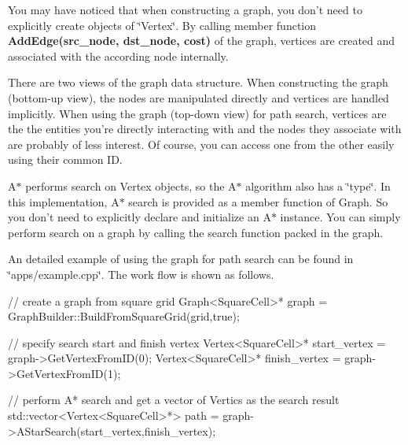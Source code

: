 \begin{DoxyItemize}
\item You may have noticed that when constructing a graph, you don't need to explicitly create objects of \char`\"{}\-Vertex\char`\"{}. By calling member function {\bfseries Add\-Edge(src\-\_\-node, dst\-\_\-node, cost)} of the graph, vertices are created and associated with the according node internally.
\item There are two views of the graph data structure. When constructing the graph (bottom-\/up view), the nodes are manipulated directly and vertices are handled implicitly. When using the graph (top-\/down view) for path search, vertices are the the entities you're directly interacting with and the nodes they associate with are probably of less interest. Of course, you can access one from the other easily using their common I\-D.
\item A$\ast$ performs search on Vertex objects, so the A$\ast$ algorithm also has a \char`\"{}type\char`\"{}. In this implementation, A$\ast$ search is provided as a member function of Graph. So you don't need to explicitly declare and initialize an A$\ast$ instance. You can simply perform search on a graph by calling the search function packed in the graph.
\item An detailed example of using the graph for path search can be found in \char`\"{}apps/example.\-cpp\char`\"{}. The work flow is shown as follows.
\end{DoxyItemize}


\begin{DoxyCode}
\textcolor{comment}{// create a graph from square grid}
Graph<SquareCell>* graph = GraphBuilder::BuildFromSquareGrid(grid,\textcolor{keyword}{true});

\textcolor{comment}{// specify search start and finish vertex}
Vertex<SquareCell>* start\_vertex = graph->GetVertexFromID(0);
Vertex<SquareCell>* finish\_vertex = graph->GetVertexFromID(1);

\textcolor{comment}{// perform A* search and get a vector of Vertics as the search result}
std::vector<Vertex<SquareCell>*> path = graph->AStarSearch(start\_vertex,finish\_vertex);
\end{DoxyCode}
 